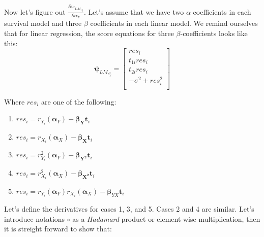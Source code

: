 \documentclass[]{article}
\begin{document}
Now let's figure out $\frac{\partial \pmb{\psi}_{LM_{r^2_Y}}}{\partial \pmb{\alpha}_Y}$. Let's assume that we have two $\alpha$ coefficients in each survival model and three $\beta$ coefficients in each linear model. We remind ourselves that for linear regression, the score equations for three $\beta$-coefficients looks like this: 
\[
\pmb{\psi}_{LM_{r^2_Y}} = 
	\begin{bmatrix}
		res_i\\
		t_{1i}res_i\\
		t_{2i}res_i\\
		-\sigma^2 + res_i^2\\
 	\end{bmatrix} 
\]

Where $res_i$ are one of the following:
\begin{enumerate}
  \item $res_i = r_{Y_i}(\pmb{\alpha}_Y) - \pmb{\beta_{Y}}\pmb{t}_i$
  \item $res_i = r_{X_i}(\pmb{\alpha}_X) - \pmb{\beta_{X}}\pmb{t}_i$
  \item $res_i = r^2_{Y_i}(\pmb{\alpha}_Y) - \pmb{\beta_{Y^2}}\pmb{t}_i$
  \item $res_i = r^2_{X_i}(\pmb{\alpha}_X) - \pmb{\beta_{X^2}}\pmb{t}_i$
  \item $res_i = r_{Y_i}(\pmb{\alpha}_Y)r_{X_i}(\pmb{\alpha}_X) - \pmb{\beta}_{YX}\pmb{t}_i$
\end{enumerate}

Let's define the derivatives for cases 1, 3, and 5. Cases 2 and 4 are similar. Let's introduce notations $\circ$ as a \emph{Hadamard} product or element-wise multiplication, then it is streight forward to show that:
\end{document}
